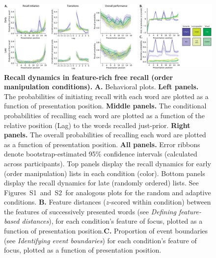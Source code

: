 \documentclass[11pt]{article}
\newcommand{\dynamicsRandom}{S1}
\newcommand{\dynamicsAdaptive}{S2}
\begin{document}
\begin{figure}[tp] \centering
\includegraphics[width=\textwidth]{figures/recall_dynamics}

\caption{\textbf{Recall dynamics in feature-rich free recall (order
manipulation conditions).} \textbf{A.} Behavioral plots. \textbf{Left panels.}
The probabilities of initiating recall with each word are plotted as a function
of presentation position. \textbf{Middle panels.} The conditional probabilities
of recalling each word are plotted as a function of the relative position (Lag)
to the words recalled just-prior. \textbf{Right panels.} The overall
probabilities of recalling each word are plotted as a function of presentation
position. \textbf{All panels.} Error ribbons denote bootstrap-estimated 95\%
confidence intervals (calculated across participants). Top panels display the
recall dynamics for early (order manipulation) lists in each condition (color).
Bottom panels display the recall dynamics for late (randomly ordered) lists.
See Figures~\dynamicsRandom~and~\dynamicsAdaptive~for analogous plots for the
random and adaptive conditions. \textbf{B.} Feature distances ($z$-scored
within condition) between the features of successively presented words (see
\textit{Defining feature-based distances}), for each condition's feature of
focus, plotted as a function of presentation position.\textbf{C.} Proportion of
event boundaries (see \textit{Identifying event boundaries}) for each
condition's feature of focus, plotted as a function of presentation position.}

    \label{fig:recall-dynamics}
\end{figure}
\end{document}
